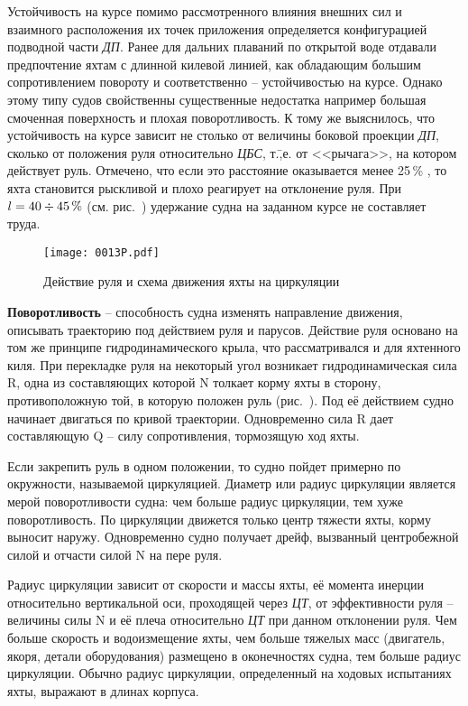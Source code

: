 Устойчивость на курсе помимо рассмотренного влияния внешних сил и взаимного расположения их точек приложения определяется конфигурацией подводной части \textit{ДП}. Ранее для дальних плаваний по открытой воде отдавали предпочтение яхтам с длинной килевой линией, как обладающим большим сопротивлением повороту и соответственно \--- устойчивостью на курсе. Однако этому типу судов свойственны существенные недостатка например большая смоченная поверхность и плохая поворотливость. К тому же выяснилось, что устойчивость на курсе зависит не столько от величины боковой проекции \textit{ДП}, сколько от положения руля относительно \textit{ЦБС}, т.\=,е. от <<рычага>>, на котором действует руль. Отмечено, что если это расстояние оказывается менее 25\,\% \lkvl, то яхта становится рыскливой и плохо реагирует на отклонение руля. При $l = 40 \div 45\,\%$ \lkvl (см. рис.~) удержание судна на заданном курсе не составляет труда.

\begin{figure*}[htb]
  \centering
  \texttt{[image: 0013P.pdf]}
  \caption{Действие руля и схема движения яхты на циркуляции}
  \label{fig:13}
\end{figure*}

\textbf{Поворотливость} \--- способность судна изменять направление движения, описывать траекторию под действием руля и парусов. Действие руля основано на том же принципе гидродинамического крыла, что рассматривался и для яхтенного киля. При перекладке руля на некоторый угол возникает гидродинамическая сила \ve R, одна из составляющих которой \ve N толкает корму яхты в сторону, противоположную той, в которую положен руль (рис.~). Под её действием судно начинает двигаться по кривой траектории. Одновременно сила \ve R дает составляющую \ve Q \--- силу сопротивления, тормозящую ход яхты.

Если закрепить руль в одном положении, то судно пойдет примерно по окружности, называемой циркуляцией. Диаметр или радиус циркуляции является мерой поворотливости судна: чем больше радиус циркуляции, тем хуже поворотливость. По циркуляции движется только центр тяжести яхты, корму выносит наружу. Одновременно судно получает дрейф, вызванный центробежной силой и отчасти силой \ve N на пере руля.

Радиус циркуляции зависит от скорости и массы яхты, её момента инерции относительно вертикальной оси, проходящей через \textit{ЦТ}, от эффективности руля \--- величины силы \ve N и её плеча относительно \textit{ЦТ} при данном отклонении руля. Чем больше скорость и водоизмещение яхты, чем больше тяжелых масс (двигатель, якоря, детали оборудования) размещено в оконечностях судна, тем больше радиус циркуляции. Обычно радиус циркуляции, определенный на ходовых испытаниях яхты, выражают в длинах корпуса.

